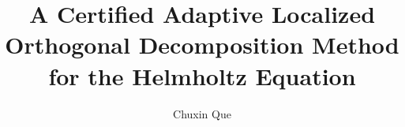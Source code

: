 \usepackage[T1]{fontenc}
\usepackage[utf8]{inputenc}
\usepackage{microtype}
\usepackage{amsmath,amssymb,mathtools,mathrsfs}
\usepackage{booktabs}
\usepackage{graphicx}
\usepackage[hidelinks]{hyperref}
\usepackage[nameinlink,noabbrev]{cleveref}


\allowdisplaybreaks
\raggedbottom

\theoremstyle{plain}
\newtheorem{theorem}{Theorem}[section]
\newtheorem{lemma}[theorem]{Lemma}
\newtheorem{proposition}[theorem]{Proposition}
\newtheorem{corollary}[theorem]{Corollary}

\theoremstyle{definition}
\newtheorem{definition}[theorem]{Definition}
\newtheorem{assumption}[theorem]{Assumption}
\newtheorem{algorithm}[theorem]{Algorithm}

\theoremstyle{remark}
\newtheorem{remark}[theorem]{Remark}


\newcommand{\Om}{\Omega}
\newcommand{\Gd}{\Gamma_D}
\newcommand{\Gn}{\Gamma_N}
\newcommand{\Gr}{\Gamma_R}
\newcommand{\VH}{V_H}
\newcommand{\Vh}{V_h}
\newcommand{\Wh}{W_h}
\newcommand{\THc}{\mathcal T_H}
\newcommand{\Th}{\mathcal T_h}
\newcommand{\Qinf}{\mathcal Q_\infty}
\newcommand{\Qinfs}{\mathcal Q_\infty^*}
\newcommand{\Qih}{\mathcal Q_{\infty,h}}
\newcommand{\Qihs}{\mathcal Q_{\infty,h}^*}
\newcommand{\Qlr}{\mathcal Q_{\ell,h}}
\newcommand{\Qlrs}{\mathcal Q_{\ell,h}^*}
\newcommand{\norm}[1]{\left\lVert #1\right\rVert}
\newcommand{\abs}[1]{\left\lvert #1\right\rvert}
\newcommand{\set}[1]{\left\{ #1\right\}}
\newcommand{\ii}{\mathrm i}
\newcommand{\supp}{\operatorname{supp}}
\newcommand{\id}{\operatorname{id}}
\newcommand{\Ca}{C_a}
\newcommand{\cw}{c_W}
\newcommand{\etaH}{\eta_H}
\newcommand{\etaEq}{\eta_{\mathrm{eq}}}
\newcommand{\ThetaLoc}{\Theta_{\mathrm{loc}}}
\newcommand{\deltaLocHat}{\widehat\delta_{\mathrm{loc}}}
\newcommand{\rhoP}{\widehat\rho_{\mathrm p}}
\newcommand{\rhoA}{\widehat\rho_{\mathrm a}}
\newcommand{\epsP}{\widehat\varepsilon_{\mathrm p}}
\newcommand{\epsA}{\widehat\varepsilon_{\mathrm a}}
\newcommand{\betaInf}{\underline\beta_\infty}
\newcommand{\Uex}{U_{\mathrm{ex}}}
\newcommand{\tolex}{\mathrm{tol}_{\mathrm{ex}}}
\newcommand{\dd}{\,\mathrm d}
\newcommand{\pos}[1]{\left[#1\right]_+}

\title[Certified adaptive Helmholtz LOD]{A Certified Adaptive Localized
Orthogonal Decomposition Method for the Helmholtz Equation}
\author{Chuxin Que}

